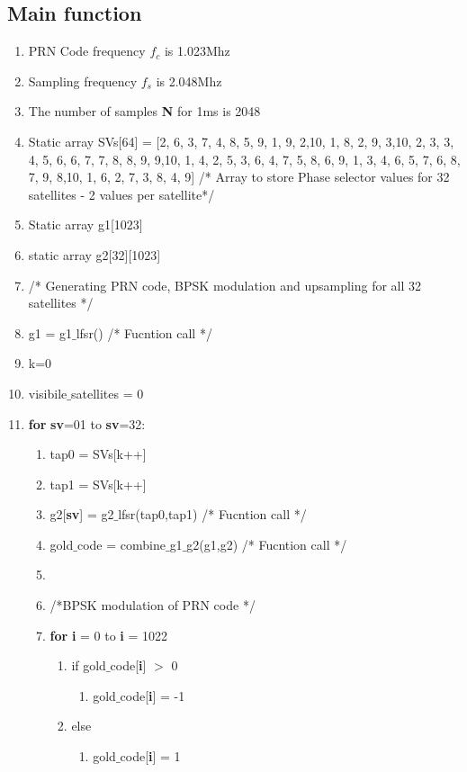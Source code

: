 \documentclass[journal,10pt,onecolumn]{article}
\begin{document}
\subsection{Main function}
\begin{enumerate}

\item PRN Code frequency $f_c$ is 1.023Mhz
\item Sampling frequency $f_s$ is 2.048Mhz
\item The number of samples \textbf{N} for 1ms is 2048 
    \item Static array SVs[64] = [2, 6,
    3, 7,
    4, 8,
    5, 9,
    1, 9,
    2,10,
    1, 8,
    2, 9,
    3,10,
    2, 3,
    3, 4,
    5, 6,
    6, 7,
    7, 8,
    8, 9,
    9,10,
    1, 4,
    2, 5,
    3, 6,
    4, 7,
    5, 8, 
    6, 9,
    1, 3,
    4, 6,
    5, 7, 
    6, 8,
    7, 9,
    8,10,
    1, 6,
    2, 7,
    3, 8,
    4, 9]  \hspace{5mm}   /* Array to store Phase selector values for 32 satellites - 2 values per satellite*/
    \item Static array g1[1023]
    \item static array g2[32][1023]
    \item[] /* Generating PRN code, BPSK modulation and upsampling for all 32 satellites  */
    \item g1 =  g1$\_$lfsr()  /* Fucntion call */
    \item k=0
    \item visibile$\_$satellites = 0
	\item \textbf{for} \textbf{sv}=01 to \textbf{sv}=32: 
	
	\begin{enumerate}
    \renewcommand{\labelenumii}{\roman{enumii}}
        \item[] tap0 = SVs[k++]
        \item[] tap1 = SVs[k++]
        \item[] g2[\textbf{sv}] = g2$\_$lfsr(tap0,tap1)   /* Fucntion call */
        \item[] gold$\_$code = combine$\_$g1$\_$g2(g1,g2)  /* Fucntion call */
        \item[] \item[] /*BPSK modulation of PRN code */
        \item[] \textbf{for} \textbf{i} = 0 to \textbf{i} = 1022
        \begin{enumerate}
            \item[] if gold$\_$code[\textbf{i}] $>$  0 
            \begin{enumerate}
                \item[]  gold$\_$code[\textbf{i}] = -1
            \end{enumerate}
            \item[] else
            \begin{enumerate}
                \item[]  gold$\_$code[\textbf{i}] = 1
            \end{enumerate}
        \end{enumerate} 


\end{enumerate}
\end{enumerate}
\end{document}
